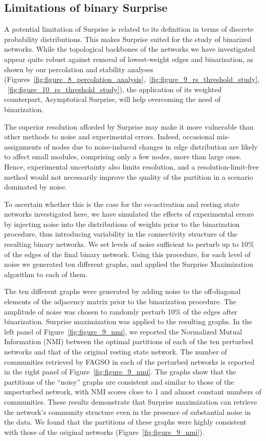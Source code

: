 \subsection{Limitations of binary Surprise}

A potential limitation of Surprise is related to its definition in terms of discrete probability distributions. This makes Surprise suited for the study of binarized networks. While the topological backbones of the networks we have investigated appear quite robust against removal of lowest-weight edges and binarization, as shown by our percolation and stability analyses (Figures~\ref{fig:figure_8_percolation_analysis},~\ref{fig:figure_9_rs_threshold_study},~\ref{fig:figure_10_rs_threshold_study}), the application of its weighted counterpart, Asymptotical Surprise, will help overcoming the need of binarization.

The superior resolution afforded by Surprise may make it more vulnerable than other methods to noise and experimental errors. Indeed, occasional mis-assignments of nodes due to noise-induced changes in edge distribution are likely to affect small modules, comprising only a few nodes, more than large ones. Hence, experimental uncertainty also limits resolution, and a resolution-limit-free method would not necessarily improve the quality of the partition in a scenario dominated by noise. 

To ascertain whether this is the case for the co-activation and resting state networks investigated here, we have simulated the effects of experimental errors by injecting noise into the distributions of weights prior to the binarization procedure, thus introducing variability in the connectivity structure of the resulting binary networks.
We set levels of noise sufficient to perturb up to 10\% of the edges of the final binary network. Using this procedure, for each level of noise we generated ten different graphs, and applied the Surprise Maximization algorithm to each of them. 

The ten different graphs were generated by adding noise to the off-diagonal elements of the adjacency matrix prior to the binarization procedure. The amplitude of noise was chosen to randomly perturb 10\% of the edges after binarization. Surprise maximization was applied to the resulting graphs. In the left panel of Figure~\ref{fig:figure_9_nmi}, we reported the Normalized Mutual Information (NMI) between the optimal partitions of each of the ten perturbed networks and that of the original resting state network.
The number of communities retrieved by FAGSO in each of the perturbed networks is reported in the right panel of Figure~\ref{fig:figure_9_nmi}. The graphs show that the partitions of the ``noisy'' graphs are consistent and similar to those of the unperturbed network, with NMI scores close to 1 and almost constant numbers of communities.
These results demonstrate that Surprise maximization can retrieve the network's community structure even in the presence of substantial noise in the data.
We found that the partitions of these graphs were highly consistent with those of the original networks (Figure~\ref{fig:figure_9_nmi}).


